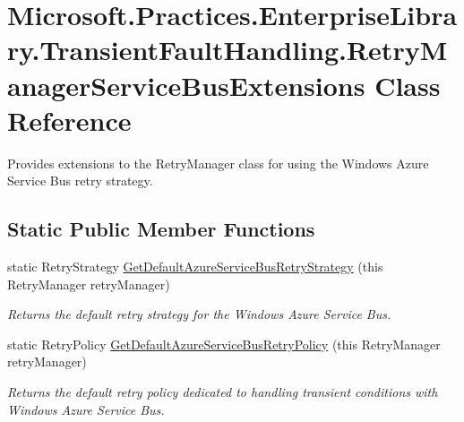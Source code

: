 \hypertarget{classMicrosoft_1_1Practices_1_1EnterpriseLibrary_1_1TransientFaultHandling_1_1RetryManagerServiceBusExtensions}{}\section{Microsoft.\+Practices.\+Enterprise\+Library.\+Transient\+Fault\+Handling.\+Retry\+Manager\+Service\+Bus\+Extensions Class Reference}
\label{classMicrosoft_1_1Practices_1_1EnterpriseLibrary_1_1TransientFaultHandling_1_1RetryManagerServiceBusExtensions}


Provides extensions to the Retry\+Manager class for using the Windows Azure Service Bus retry strategy.  


\subsection*{Static Public Member Functions}
\begin{DoxyCompactItemize}
\item 
static Retry\+Strategy \hyperlink{classMicrosoft_1_1Practices_1_1EnterpriseLibrary_1_1TransientFaultHandling_1_1RetryManagerServiceBusExtensions_a3e72201eeee2ca37a4a3e998039c25d4_a3e72201eeee2ca37a4a3e998039c25d4}{Get\+Default\+Azure\+Service\+Bus\+Retry\+Strategy} (this Retry\+Manager retry\+Manager)
\begin{DoxyCompactList}\small\item\em Returns the default retry strategy for the Windows Azure Service Bus. \end{DoxyCompactList}\item 
static Retry\+Policy \hyperlink{classMicrosoft_1_1Practices_1_1EnterpriseLibrary_1_1TransientFaultHandling_1_1RetryManagerServiceBusExtensions_a4ce4813c4b6aabc50d6b90d7e299c7ad_a4ce4813c4b6aabc50d6b90d7e299c7ad}{Get\+Default\+Azure\+Service\+Bus\+Retry\+Policy} (this Retry\+Manager retry\+Manager)
\begin{DoxyCompactList}\small\item\em Returns the default retry policy dedicated to handling transient conditions with Windows Azure Service Bus. \end{DoxyCompactList}\end{DoxyCompactItemize}
